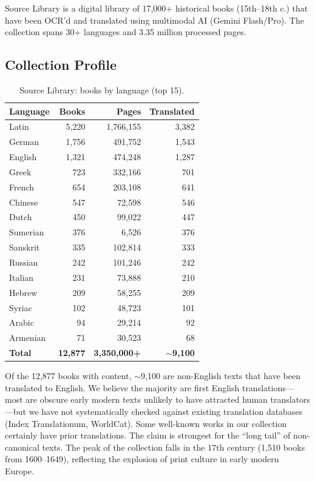 \documentclass[10pt,twocolumn]{article}
\begin{document}
Source Library is a digital library of 17,000+ historical books (15th--18th c.) that have been OCR'd and translated using multimodal AI (Gemini Flash/Pro). The collection spans 30+ languages and 3.35 million processed pages.

\subsection{Collection Profile}

\begin{table}[H]
\small
\centering
\caption{Source Library: books by language (top 15).}
\label{tab:sl}
\begin{tabular}{@{}lrrr@{}}
\toprule
Language & Books & Pages & Translated \\
\midrule
Latin & 5,220 & 1,766,155 & 3,382 \\
German & 1,756 & 491,752 & 1,543 \\
English & 1,321 & 474,248 & 1,287 \\
Greek & 723 & 332,166 & 701 \\
French & 654 & 203,108 & 641 \\
Chinese & 547 & 72,598 & 546 \\
Dutch & 450 & 99,022 & 447 \\
Sumerian & 376 & 6,526 & 376 \\
Sanskrit & 335 & 102,814 & 333 \\
Russian & 242 & 101,246 & 242 \\
Italian & 231 & 73,888 & 210 \\
Hebrew & 209 & 58,255 & 209 \\
Syriac & 102 & 48,723 & 101 \\
Arabic & 94 & 29,214 & 92 \\
Armenian & 71 & 30,523 & 68 \\
\midrule
\textbf{Total} & \textbf{12,877} & \textbf{3,350,000+} & \textbf{${\sim}$9,100} \\
\bottomrule
\end{tabular}
\end{table}

Of the 12,877 books with content, ${\sim}$9,100 are non-English texts that have been translated to English. We believe the majority are first English translations---most are obscure early modern texts unlikely to have attracted human translators---but we have not systematically checked against existing translation databases (Index Translationum, WorldCat). Some well-known works in our collection certainly have prior translations. The claim is strongest for the ``long tail'' of non-canonical texts. The peak of the collection falls in the 17th century (1,510 books from 1600--1649), reflecting the explosion of print culture in early modern Europe.
\end{document}
